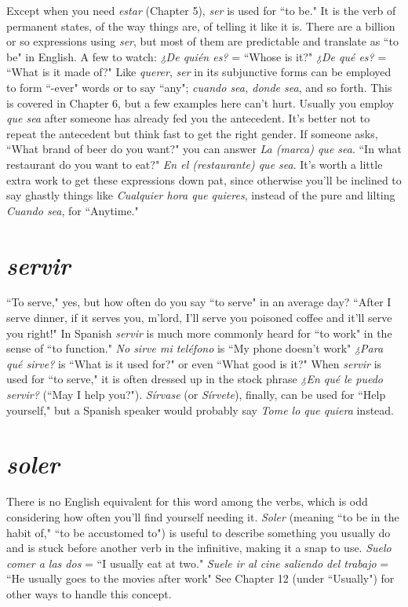 Except when you need \emph{estar} (Chapter 5), \emph{ser} is used for ``to
be." It is the verb of permanent states, of the way things are, of telling
it like it is. There are a billion or so expressions using \emph{ser}, but most
of them are predictable and translate as ``to be" in English. A few to
watch: \emph{¿De quién es?} = ``Whose is it?" \emph{¿De qué es?} = ``What is it
made of?" Like \emph{querer}, \emph{ser} in its subjunctive forms can be employed
to form ``-ever" words or to say ``any"; \emph{cuando sea, donde sea}, and so
forth. This is covered in Chapter 6, but a few examples here can't hurt.
Usually you employ \emph{que sea} after someone has already fed you the antecedent. It's better not to repeat the antecedent but think fast to get
the right gender. If someone asks, ``What brand of beer do you want?"
you can answer \emph{La (marca) que sea}. ``In what restaurant do you want
to eat?" \emph{En el (restaurante) que sea}. It's worth a little extra work to get
these expressions down pat, since otherwise you'll be inclined to say
ghastly things like \emph{Cualquier hora que quieres}, instead of the pure and
lilting \emph{Cuando sea}, for ``Anytime."

\section{\emph{servir}}

``To serve," yes, but how often do you say ``to serve" in an average day? ``After I serve dinner, if it serves you, m'lord, I'll serve you
poisoned coffee and it'll serve you right!" In Spanish \emph{servir} is much
more commonly heard for ``to work" in the sense of ``to function."
\emph{No sirve mi teléfono} is ``My phone doesn't work" \emph{¿Para qué sirve?} is
``What is it used for?" or even ``What good is it?" When \emph{servir} is used
for ``to serve," it is often dressed up in the stock phrase \emph{¿En qué le
puedo servir?} (``May I help you?"). \emph{Sírvase} (or \emph{Sírvete}), finally, can be
used for ``Help yourself," but a Spanish speaker would probably say
\emph{Tome lo que quiera} instead.

\section{\emph{soler}}

There is no English equivalent for this word among the verbs,
which is odd considering how often you'll find yourself needing it. \emph{Soler} (meaning ``to be in the habit of," ``to be accustomed to") is useful to
describe something you usually do and is stuck before another verb
in the infinitive, making it a snap to use. \emph{Suelo comer a las dos} = ``I
usually eat at two." \emph{Suele ir al cine saliendo del trabajo} = ``He usually goes to the movies after work" See Chapter 12 (under ``Usually")
for other ways to handle this concept.

